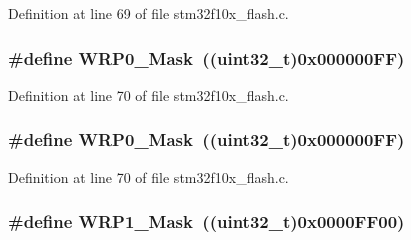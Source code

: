 Definition at line 69 of file stm32f10x\+\_\+flash.\+c.

\subsubsection[{\texorpdfstring{W\+R\+P0\+\_\+\+Mask}{WRP0_Mask}}]{\setlength{\rightskip}{0pt plus 5cm}\#define W\+R\+P0\+\_\+\+Mask~(({\bf uint32\+\_\+t})0x000000\+F\+F)}\hypertarget{group___f_l_a_s_h___private___defines_ga79707964cbd409601e1ddf6064cf1c5c}{}\label{group___f_l_a_s_h___private___defines_ga79707964cbd409601e1ddf6064cf1c5c}


Definition at line 70 of file stm32f10x\+\_\+flash.\+c.

\subsubsection[{\texorpdfstring{W\+R\+P0\+\_\+\+Mask}{WRP0_Mask}}]{\setlength{\rightskip}{0pt plus 5cm}\#define W\+R\+P0\+\_\+\+Mask~(({\bf uint32\+\_\+t})0x000000\+F\+F)}\hypertarget{group___f_l_a_s_h___private___defines_ga79707964cbd409601e1ddf6064cf1c5c}{}\label{group___f_l_a_s_h___private___defines_ga79707964cbd409601e1ddf6064cf1c5c}


Definition at line 70 of file stm32f10x\+\_\+flash.\+c.

\subsubsection[{\texorpdfstring{W\+R\+P1\+\_\+\+Mask}{WRP1_Mask}}]{\setlength{\rightskip}{0pt plus 5cm}\#define W\+R\+P1\+\_\+\+Mask~(({\bf uint32\+\_\+t})0x0000\+F\+F00)}\hypertarget{group___f_l_a_s_h___private___defines_gaa2b2535ba91736dd2d6baa92068686e0}{}\label{group___f_l_a_s_h___private___defines_gaa2b2535ba91736dd2d6baa92068686e0}


